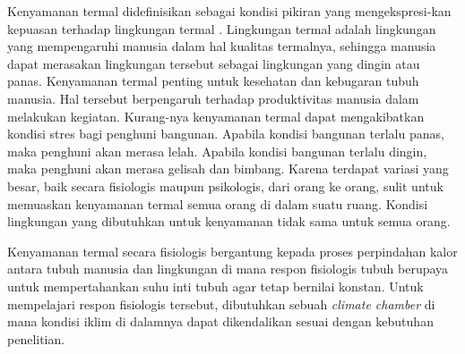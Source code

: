 Kenyamanan termal didefinisikan sebagai kondisi pikiran yang mengekspresi-kan kepuasan terhadap lingkungan termal \cite{ASHRAE55}. Lingkungan termal adalah lingkungan yang mempengaruhi manusia dalam hal kualitas termalnya, sehingga manusia dapat merasakan lingkungan tersebut sebagai lingkungan yang dingin atau panas. Kenyamanan termal penting untuk kesehatan dan kebugaran tubuh manusia. Hal tersebut berpengaruh terhadap produktivitas manusia dalam melakukan kegiatan. Kurang-nya kenyamanan termal dapat mengakibatkan kondisi stres bagi penghuni bangunan. Apabila kondisi bangunan terlalu panas, maka penghuni akan merasa lelah. Apabila kondisi bangunan terlalu dingin, maka penghuni akan merasa gelisah dan bimbang. Karena terdapat variasi yang besar, baik secara fisiologis maupun psikologis, dari orang ke orang, sulit untuk memuaskan kenyamanan termal semua orang di dalam suatu ruang. Kondisi lingkungan yang dibutuhkan untuk kenyamanan tidak sama untuk semua orang. 

Kenyamanan termal secara fisiologis bergantung kepada proses perpindahan kalor antara tubuh manusia dan lingkungan di mana respon fisiologis tubuh berupaya untuk mempertahankan suhu inti tubuh agar tetap bernilai konstan. Untuk mempelajari respon fisiologis tersebut, dibutuhkan sebuah \textit{climate chamber} di mana kondisi iklim di dalamnya dapat dikendalikan sesuai dengan kebutuhan penelitian.



